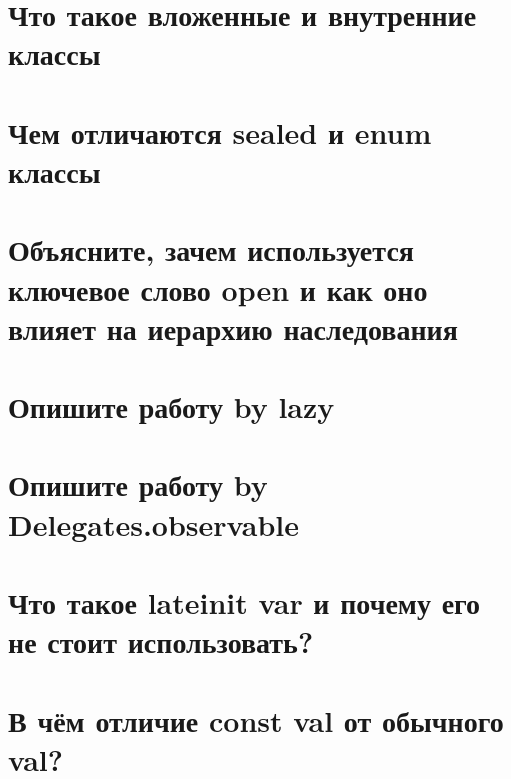 \documentclass[12pt]{article}
\begin{document}
\section*{Что такое вложенные и внутренние классы}
\begin{enumerate}[leftmargin=*]
\end{enumerate}
\vspace{2mm}
\section*{Чем отличаются sealed и enum классы}
\begin{enumerate}[leftmargin=*]
\end{enumerate}
\vspace{2mm}
\section*{Объясните, зачем используется ключевое слово open и как оно влияет на иерархию наследования}
\begin{enumerate}[leftmargin=*]
\end{enumerate}
\vspace{2mm}
\section*{Опишите работу by lazy}
\begin{enumerate}[leftmargin=*]
\end{enumerate}
\vspace{2mm}
\section*{Опишите работу by Delegates.observable}
\begin{enumerate}[leftmargin=*]
\end{enumerate}
\vspace{2mm}
\section*{Что такое lateinit var и почему его не стоит использовать?}
\begin{enumerate}[leftmargin=*]
\end{enumerate}
\vspace{2mm}
\section*{В чём отличие const val от обычного val?}
\begin{enumerate}[leftmargin=*]
\end{enumerate}
\vspace{2mm}
\end{document}
